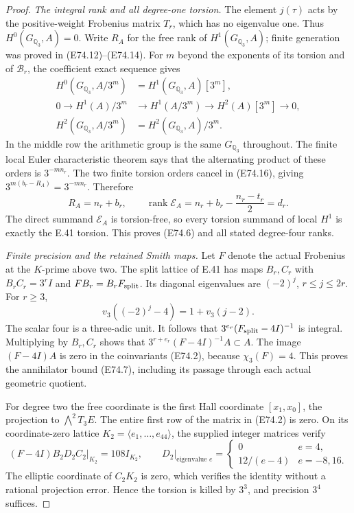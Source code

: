 \begin{proof}
\emph{The integral rank and all degree-one torsion.}
The element $j(\tau)$ acts by the positive-weight
Frobenius matrix $T_r$, which has no eigenvalue one.
Thus $H^0(G_{\mathbb Q_3},A)=0$. Write $R_A$ for the
free rank of $H^1(G_{\mathbb Q_3},A)$; finite generation
was proved in (E74.12)--(E74.14). For $m$ beyond the
exponents of its torsion and of $\mathcal B_r$, the
coefficient exact sequence gives
\[
 \begin{split}
 H^0(G_{\mathbb Q_3},A/3^m)&=H^1(G_{\mathbb Q_3},A)[3^m],\\
 0\longrightarrow H^1(A)/3^m&\longrightarrow H^1(A/3^m)
       \longrightarrow H^2(A)[3^m]\longrightarrow0,\\
 H^2(G_{\mathbb Q_3},A/3^m)&=H^2(G_{\mathbb Q_3},A)/3^m.
 \end{split}
 \tag{E74.16}
\]
In the middle row the arithmetic group is the same
$G_{\mathbb Q_3}$ throughout. The finite local Euler
characteristic theorem
\cite[I, Theorem2.8, pp.~31--34]{E_MilneADT} says that
the alternating product of these orders is $3^{-mn_r}$.
The two finite torsion orders cancel in (E74.16), giving
$3^{m(b_r-R_A)}=3^{-mn_r}$. Therefore
\[
 R_A=n_r+b_r,\qquad
 \operatorname{rank}\mathcal E_A
   =n_r+b_r-\frac{n_r-t_r}{2}=d_r.
 \tag{E74.17}
\]
The direct summand $\mathcal E_A$ is torsion-free, so
every torsion summand of local $H^1$ is exactly the
E.41 torsion. This proves (E74.6) and all stated
degree-four ranks.

\emph{Finite precision and the retained Smith maps.}
Let $F$ denote the actual Frobenius at the $K$-prime
above two. The split lattice of E.41 has maps $B_r,C_r$
with $B_rC_r=3^rI$ and
$F B_r=B_r F_{\rm split}$. Its diagonal eigenvalues
are $(-2)^j$, $r\le j\le2r$. For $r\ge3$,
\[
 v_3((-2)^j-4)=1+v_3(j-2).
 \tag{E74.18}
\]
The scalar four is a three-adic unit. It follows that
$3^{e_r}(F_{\rm split}-4I)^{-1}$ is integral. Multiplying
by $B_r,C_r$ shows that
$3^{r+e_r}(F-4I)^{-1}A\subset A$. The image $(F-4I)A$
is zero in the coinvariants (E74.2), because $\chi_3(F)=4$.
This proves the annihilator bound (E74.7), including its
passage through each actual geometric quotient.

For degree two the free coordinate is the first Hall
coordinate $[x_1,x_0]$, the projection to
$\bigwedge^2T_3E$. The entire first row of the matrix
in (E74.2) is zero. On its coordinate-zero lattice
$K_2=\langle e_1,\ldots,e_{44}\rangle$, the supplied
integer matrices verify
\[
 (F-4I)B_2D_2C_2\big|_{K_2}=108I_{K_2},
 \qquad
 D_2\big|_{\text{eigenvalue }e}
   =\begin{cases}0&e=4,\\12/(e-4)&e=-8,16.
     \end{cases}
 \tag{E74.19}
\]
The elliptic coordinate of $C_2K_2$ is zero, which
verifies the identity without a rational projection
error. Hence the torsion is killed by $3^3$, and
precision $3^4$ suffices.


\end{proof}
